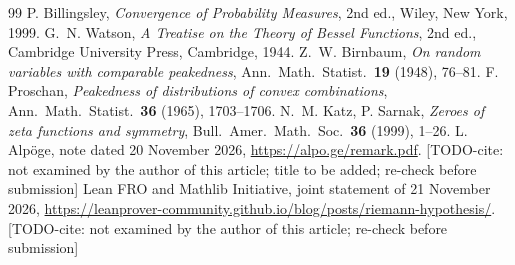 \documentclass[11pt]{amsart}
\theoremstyle{definition}
\numberwithin{equation}{section}
\newcommand{\todocite}[1]{\textsf{[TODO-cite: #1]}}
\begin{document}
\begin{thebibliography}{99}
 P. Billingsley, \emph{Convergence of Probability
Measures}, 2nd ed., Wiley, New York, 1999.
 G.~N. Watson, \emph{A Treatise on the Theory of Bessel
Functions}, 2nd ed., Cambridge University Press, Cambridge, 1944.
 Z.~W. Birnbaum, \emph{On random variables with
comparable peakedness}, Ann.\ Math.\ Statist.\ \textbf{19} (1948),
76--81.
 F. Proschan, \emph{Peakedness of distributions of
convex combinations}, Ann.\ Math.\ Statist.\ \textbf{36} (1965),
1703--1706.
 N.~M. Katz, P. Sarnak, \emph{Zeroes of zeta functions
and symmetry}, Bull.\ Amer.\ Math.\ Soc.\ \textbf{36} (1999), 1--26.
 L. Alp\"oge, note dated 20 November 2026,
\url{https://alpo.ge/remark.pdf}. \todocite{not examined by the
author of this article; title to be added; re-check before
submission}
 Lean FRO and Mathlib Initiative, joint statement of
21 November 2026,
\url{https://leanprover-community.github.io/blog/posts/riemann-hypothesis/}.
\todocite{not examined by the author of this article; re-check
before submission}
\end{thebibliography}
\end{document}
